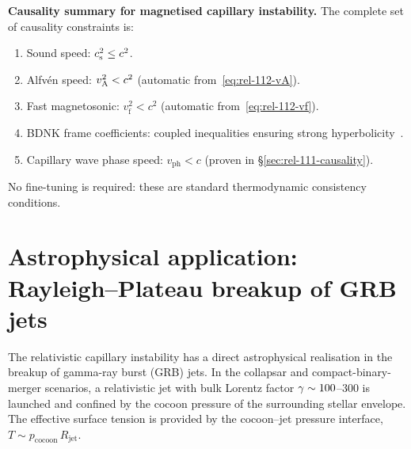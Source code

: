 \begin{relcorrection}
\textbf{Causality summary for magnetised capillary instability.}
The complete set of causality constraints is:
\begin{enumerate}
\item Sound speed: $c_{\mathrm{s}}^{2} \leq c^{2}$.
\item Alfv\'en speed: $v_{\mathrm{A}}^{2} < c^{2}$ (automatic
  from~\eqref{eq:rel-112-vA}).
\item Fast magnetosonic: $v_{\mathrm{f}}^{2} < c^{2}$ (automatic
  from~\eqref{eq:rel-112-vf}).
\item BDNK frame coefficients: coupled inequalities ensuring strong
  hyperbolicity~\cite{BemficaDNK2023}.
\item Capillary wave phase speed: $v_{\mathrm{ph}} < c$
  (proven in \S\ref{sec:rel-111-causality}).
\end{enumerate}
No fine-tuning is required: these are standard thermodynamic
consistency conditions.
\end{relcorrection}

\section{Astrophysical application: Rayleigh--Plateau breakup of GRB jets}
\label{sec:rel-111-112-astro}

The relativistic capillary instability has a direct astrophysical
realisation in the breakup of gamma-ray burst (GRB) jets.  In the
collapsar and compact-binary-merger scenarios, a relativistic jet with
bulk Lorentz factor $\gamma\sim 100$--$300$ is launched and confined by
the cocoon pressure of the surrounding stellar envelope.  The effective
surface tension is provided by the cocoon--jet pressure interface,
$T \sim p_{\mathrm{cocoon}}\,R_{\mathrm{jet}}$.


